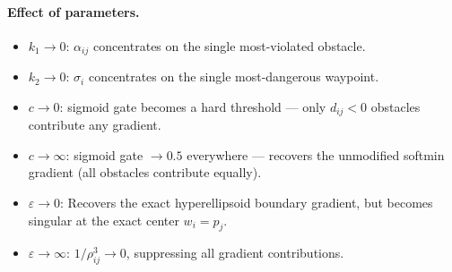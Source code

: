 \documentclass{article}
\begin{document}
\paragraph{Effect of parameters.}
\begin{itemize}
    \item $k_1 \to 0$: $\alpha_{ij}$ concentrates on the single most-violated obstacle.
    \item $k_2 \to 0$: $\sigma_i$ concentrates on the single most-dangerous waypoint.
    \item $c \to 0$: sigmoid gate becomes a hard threshold ---
          only $d_{ij} < 0$ obstacles contribute any gradient.
    \item $c \to \infty$: sigmoid gate $\to 0.5$ everywhere ---
          recovers the unmodified softmin gradient (all obstacles contribute equally).
    \item $\varepsilon \to 0$: Recovers the exact hyperellipsoid boundary gradient, but becomes singular at the exact center $w_i = p_j$.
    \item $\varepsilon \to \infty$: $1/\rho_{ij}^3 \to 0$, suppressing all gradient contributions.
\end{itemize}
 
 
 
 
 
 
\end{document}
